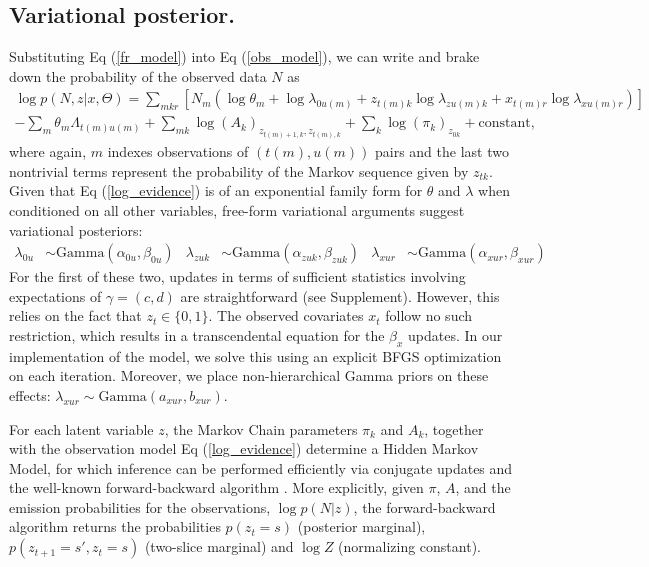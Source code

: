 \documentclass{nature}
\begin{document}
\subsection{Variational posterior.}
Substituting Eq (\ref{fr_model}) into Eq (\ref{obs_model}), we can write and brake down the probability of the observed data $N$ as
\begin{multline}
    \label{log_evidence}
    \log p(N, z|x, \Theta) = \sum_{mkr} \left[
        N_m \left( \log \theta_m +
            \log \lambda_{0u(m)} +
            z_{t(m) k} \log \lambda_{zu(m) k} +
            x_{t(m) r} \log \lambda_{xu(m) r}
            \right)
    \right] \\
    - \sum_m \theta_m \Lambda_{t(m) u(m)} +
    \sum_{mk} \log (A_k)_{z_{t(m)+1, k}, z_{t(m), k}} +
    \sum_k \log (\pi_k)_{z_{0k}} + \text{constant,}
\end{multline}
where again, $m$ indexes observations of $(t(m),u(m))$ pairs and the last two nontrivial terms represent the probability of the Markov sequence given by $z_{tk}$. Given that Eq (\ref{log_evidence}) is of an exponential family form for $\theta$ and $\lambda$ when conditioned on all other variables, free-form variational arguments \cite{Wainwright2008-ii} suggest variational posteriors:
\begin{align}
    \lambda_{0u} &\sim \text{Gamma}(\alpha_{0u}, \beta_{0u}) &
    \lambda_{zuk} &\sim \text{Gamma}(\alpha_{zuk}, \beta_{zuk}) &
    \lambda_{xur} &\sim \text{Gamma}(\alpha_{xur}, \beta_{xur})
\end{align}
For the first of these two, updates in terms of sufficient statistics involving expectations of $\gamma = (c, d)$ are straightforward (see Supplement). However, this relies on the fact that $z_t \in \lbrace0, 1\rbrace$. The observed covariates $x_t$ follow no such restriction, which results in a transcendental equation for the $\beta_x$ updates. In our implementation of the model, we solve this using an explicit BFGS optimization on each iteration. Moreover, we place non-hierarchical Gamma priors on these effects: $\lambda_{xur} \sim \text{Gamma}(a_{xur}, b_{xur})$.

For each latent variable $z$, the Markov Chain parameters $\pi_k$ and $A_k$, together with the observation model Eq (\ref{log_evidence}) determine a Hidden Markov Model, for which inference can be performed efficiently via conjugate updates and the well-known forward-backward algorithm \cite{beal2003variational}. More explicitly, given $\pi$, $A$, and the emission probabilities for the observations, $\log p(N|z)$, the forward-backward algorithm returns the probabilities $p(z_t=s)$ (posterior marginal), $p(z_{t+1} =s', z_t=s)$ (two-slice marginal) and $\log Z$ (normalizing constant).
\end{document}
